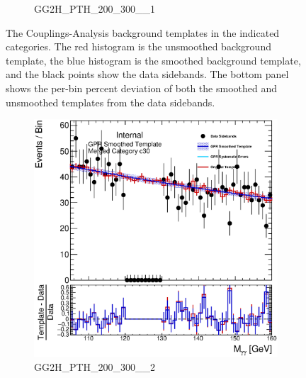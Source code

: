 \begin{figure}
\begin{center}
\begin{subfigure}[T]{0.49\linewidth}
	\caption{GG2H\_PTH\_200\_300\_\_1}
\end{subfigure}
	\caption{The Couplings-Analysis background templates in the indicated categories. The red histogram is the unsmoothed background template, the blue histogram is the smoothed background template, and the black points show the data sidebands. The bottom panel shows the per-bin percent deviation of both the smoothed and unsmoothed templates from the data sidebands. }
 \label{fig:gpr_coupcat_7}
 \end{center}
\end{figure}

\begin{figure}
\begin{center}
\begin{subfigure}[T]{0.49\linewidth}
	\centering
	\includegraphics[width=\linewidth]{figures/background/gpr/coupCatTemplates/GPR_Smoothed_Plot_hmgg_c30.eps}
	\caption{GG2H\_PTH\_200\_300\_\_2}
\end{subfigure}
\begin{subfigure}[T]{0.49\linewidth}
	\centering

\end{subfigure}
\end{center}
\end{figure}
